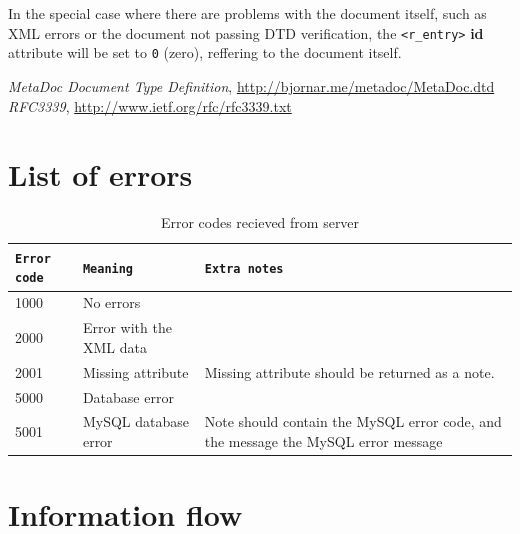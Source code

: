 \documentclass[titlepage, a4paper,10pt]{article}
\begin{document}
In the special case where there are problems with the document itself, such as 
XML errors or the document not passing DTD verification, the \texttt{<r\_entry>} 
\textbf{id} attribute will be set to \texttt{0} (zero), reffering to the 
document itself. 


\newpage
\begin{thebibliography}{99}
     \textit{MetaDoc Document Type Definition}, 
        \url{http://bjornar.me/metadoc/MetaDoc.dtd}
     \textit{RFC3339}, \url{http://www.ietf.org/rfc/rfc3339.txt}
\end{thebibliography}

\appendix

\newpage
\section{List of errors}

\begin{table}[h]
    \caption{Error codes recieved from server}
    \begin{tabular}{|l|l|p{5cm}|}
        \hline
        \texttt{Error code} & \texttt{Meaning} & \texttt{Extra notes} \\
        \hline
        \hline
        1000 & No errors & \\
        \hline
        \hline
        2000 & Error with the XML data & \\
        \hline
        2001 & Missing attribute & Missing attribute should be returned as a note. \\
        \hline
        \hline
        5000 & Database error & \\
        \hline
        5001 & MySQL database error & Note should contain the MySQL error code, and the message the MySQL error message \\
        \hline
    \end{tabular}
    \label{tbl:server_error_codes}
\end{table}

\newpage
\section{Information flow}
\end{document}
